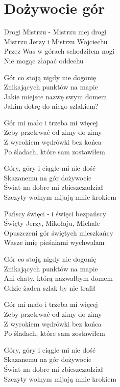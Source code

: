 \section{Dożywocie gór}
\begin{text}
    Drogi Mistrzu - Mistrzu mej drogi\\
    Mistrzu Jerzy i Mistrzu Wojciechu\\
    Przez Was w górach schodziłem nogi\\
    Nie mogąc złapać oddechu

    Gór co stoją nigdy nie dogonię\\
    Znikających punktów na mapie\\
    Jakie miejsce nazwę swym domem\\
    Jakim dotrę do niego szlakiem?

    \hfill\break
    \vin Gór mi mało i trzeba mi więcej\\
    \vin Żeby przetrwać od zimy do zimy\\
    \vin Z wyrokiem wędrówki bez końca\\
    \vin Po śladach, które sam zostawiłem

    \vin Góry, góry i ciągle mi nie dość\\
    \vin Skazanemu na gór dożywocie\\
    \vin Świat na dobre mi zbieszczadział\\
    \vin Szczyty wolnym mijają mnie krokiem

    Pańscy święci - i święci bezpańscy\\
    Święty Jerzy, Mikołaju, Michale\\
    Opuszczeni gór świętych mieszkańcy\\
    Wasze imię pieśniami wychwalam

    Gór co stoją nigdy nie dogonię\\
    Znikających punktów na mapie\\
    Ani chaty, którą nazwałbym domem\\
    Gdzie żaden szlak by nie trafił

    \vin Gór mi mało i trzeba mi więcej\\
    \vin Żeby przetrwać od zimy do zimy\\
    \vin Z wyrokiem wędrówki bez końca\\
    \vin Po śladach, które sam zostawiłem

    \vin Góry, góry i ciągle mi nie dość\\
    \vin Skazanemu na gór dożywocie\\
    \vin Świat na dobre mi zbieszczadział\\
    \vin Szczyty wolnym mijają mnie krokiem


\end{text}
